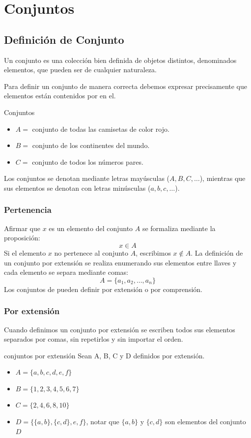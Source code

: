 \chapter{Conjuntos}
\section{Definición de Conjunto}
Un conjunto es una colección bien definida de objetos distintos, denominados elementos, que pueden ser de cualquier naturaleza.

Para definir un conjunto de manera correcta debemos expresar precisamente que elementos están contenidos por en el.

\begin{ejem}{Conjuntos}
 \begin{itemize}
	\item $A =$ conjunto de todas las camisetas de color rojo.
	\item $B =$ conjunto de los continentes del mundo.
	\item $C =$ conjunto de todos los números pares.
\end{itemize}
\end{ejem}

Los conjuntos se denotan mediante letras mayúsculas ($A, B, C, \dots$), mientras que sus elementos se denotan con letras minúsculas ($a, b, c, \dots$).

\subsection{Pertenencia} 
Afirmar que $x$ es un elemento del conjunto $A$ se formaliza mediante la proposición:
\begin{equation}
	x \in A
\end{equation}
Si el elemento $x$ no pertenece al conjunto $A$, escribimos $x \notin A$. La definición de un conjunto por extensión se realiza enumerando sus elementos entre llaves y cada elemento se separa mediante comas:
\begin{equation}
A = \{a_1, a_2, \dots, a_n\}
\end{equation}
Los conjuntos de pueden definir por extensión o por comprensión.
\subsection{Por extensión}
Cuando definimos un conjunto por extensión se escriben todos sus elementos separados por comas, sin repetirlos y sin importar el orden.
\begin{ejem}{conjuntos por extensión}
	Sean A, B, C y D definidos por extensión.
	\begin{itemize}
		\item $A = \{a,b,c,d,e,f\}$
		\item $B = \{1,2,3,4,5,6,7\}$
		\item $C = \{2,4,6,8,10\}$
		\item $D = \{\{a,b\},\{c,d\},e,f\}$, notar que $\{a,b\}$ y $\{c,d\}$ son elementos del conjunto $D$
	\end{itemize}
\end{ejem}

